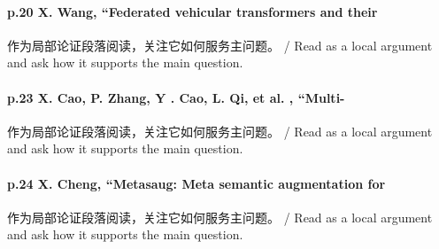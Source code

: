 \documentclass[UTF8,a4paper,11pt,fontset=fandol]{ctexart}
\begin{document}
\paragraph{p.20 X. Wang, “Federated vehicular transformers and their}作为局部论证段落阅读，关注它如何服务主问题。 / Read as a local argument and ask how it supports the main question.

\paragraph{p.23 X. Cao, P. Zhang, Y . Cao, L. Qi, et al. , “Multi-}作为局部论证段落阅读，关注它如何服务主问题。 / Read as a local argument and ask how it supports the main question.

\paragraph{p.24 X. Cheng, “Metasaug: Meta semantic augmentation for}作为局部论证段落阅读，关注它如何服务主问题。 / Read as a local argument and ask how it supports the main question.
\end{document}
